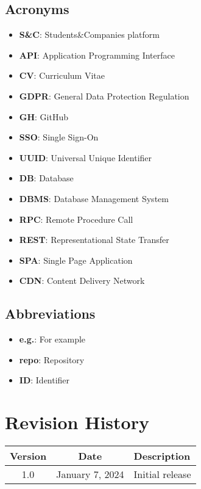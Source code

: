 \subsection{Acronyms}
\begin{itemize}
    \item \textbf{S\&C}: Students\&Companies platform
    \item \textbf{API}: Application Programming Interface
    \item \textbf{CV}: Curriculum Vitae
    \item \textbf{GDPR}: General Data Protection Regulation
    \item \textbf{GH}: GitHub
    \item \textbf{SSO}: Single Sign-On
    \item \textbf{UUID}: Universal Unique Identifier
    \item \textbf{DB}: Database
    \item \textbf{DBMS}: Database Management System
    \item \textbf{RPC}: Remote Procedure Call
    \item \textbf{REST}: Representational State Transfer
    \item \textbf{SPA}: Single Page Application
    \item \textbf{CDN}: Content Delivery Network
\end{itemize}

\subsection{Abbreviations}
\begin{itemize}
    \item \textbf{e.g.}: For example
    \item \textbf{repo}: Repository
    \item \textbf{ID}: Identifier
\end{itemize}

\section{Revision History}
\begin{table}[h!]
\centering
\begin{tabular}{|c|c|l|}
\hline
\textbf{Version} & \textbf{Date} & \textbf{Description} \\ \hline
1.0 & January 7, 2024 & Initial release \\ \hline
\end{tabular}
\end{table}


